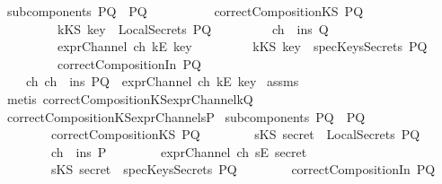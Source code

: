 \begin{isabellebody}
\ {\isachardoublequoteopen}subcomponents\ PQ\ {\isacharequal}\ {\isacharbraceleft}P{\isacharcomma}Q{\isacharbraceright}{\isachardoublequoteclose}\ \isanewline
\ \ \ \ \ \ \ \ \ {\isachardoublequoteopen}correctCompositionKS\ PQ{\isachardoublequoteclose}\isanewline
\ \ \ \ \ \ \ \ \ {\isachardoublequoteopen}kKS\ key\ {\isasymnotin}\ LocalSecrets\ PQ{\isachardoublequoteclose}\isanewline
\ \ \ \ \ \ \ \ \ {\isachardoublequoteopen}ch\ {\isasymin}\ ins\ Q{\isachardoublequoteclose}\isanewline
\ \ \ \ \ \ \ \ \ {\isachardoublequoteopen}exprChannel\ ch\ {\isacharparenleft}kE\ key{\isacharparenright}{\isachardoublequoteclose}\isanewline
\ \ \ \ \ \ \ \ \ {\isachardoublequoteopen}kKS\ key\ {\isasymnotin}\ specKeysSecrets\ PQ{\isachardoublequoteclose}\isanewline
\ \ \ \ \ \ \ \ \ {\isachardoublequoteopen}correctCompositionIn\ PQ{\isachardoublequoteclose}\isanewline
{}\ \ \ \ {\isachardoublequoteopen}{\isasymexists}ch{\isachardot}\ ch\ {\isasymin}\ ins\ PQ\ {\isasymand}\ exprChannel\ ch\ {\isacharparenleft}kE\ key{\isacharparenright}{\isachardoublequoteclose}\isanewline
%
\isadelimproof
%
\endisadelimproof
%
\isatagproof
{}\isamarkupfalse%
\ assms\isanewline
{}\isamarkupfalse%
\ {\isacharparenleft}metis\ correctCompositionKS{\isacharunderscore}exprChannel{\isacharunderscore}k{\isacharunderscore}Q{\isacharparenright}%
\endisatagproof
{\isafoldproof}%
%
\isadelimproof
\isanewline
%
\endisadelimproof
\isanewline
{}\isamarkupfalse%
\ correctCompositionKS{\isacharunderscore}exprChannel{\isacharunderscore}s{\isacharunderscore}P{\isacharcolon}\isanewline
{}\ {\isachardoublequoteopen}subcomponents\ PQ\ {\isacharequal}\ {\isacharbraceleft}P{\isacharcomma}Q{\isacharbraceright}{\isachardoublequoteclose}\ \isanewline
\ \ \ \ \ \ \ \ {\isachardoublequoteopen}correctCompositionKS\ PQ{\isachardoublequoteclose}\isanewline
\ \ \ \ \ \ \ \ {\isachardoublequoteopen}sKS\ secret\ {\isasymnotin}\ LocalSecrets\ PQ{\isachardoublequoteclose}\isanewline
\ \ \ \ \ \ \ \ {\isachardoublequoteopen}ch\ {\isasymin}\ ins\ P{\isachardoublequoteclose}\isanewline
\ \ \ \ \ \ \ \ {\isachardoublequoteopen}exprChannel\ ch\ {\isacharparenleft}sE\ secret{\isacharparenright}{\isachardoublequoteclose}\isanewline
\ \ \ \ \ \ \ \ {\isachardoublequoteopen}sKS\ secret\ {\isasymnotin}\ specKeysSecrets\ PQ{\isachardoublequoteclose}\isanewline
\ \ \ \ \ \ \ \ {\isachardoublequoteopen}correctCompositionIn\ PQ{\isachardoublequoteclose}\isanewline

\end{isabellebody}
